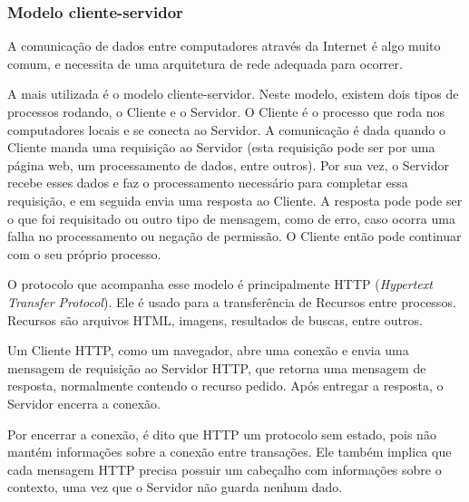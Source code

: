 \documentclass[a4paper,12pt]{article}
\begin{document}
\subsubsection{Modelo cliente-servidor}

A comunicação de dados entre computadores através da Internet é algo muito comum, e necessita de uma arquitetura de rede adequada para ocorrer.

A mais utilizada é o modelo cliente-servidor. Neste modelo, existem dois tipos de processos rodando, o Cliente e o Servidor. O Cliente é o processo que roda nos computadores locais e se conecta ao Servidor. A comunicação é dada quando o Cliente manda uma requisição ao Servidor (esta requisição pode ser por uma página web, um processamento de dados, entre outros). Por sua vez, o Servidor recebe esses dados e faz o processamento necessário para completar essa requisição, e em seguida envia uma resposta ao Cliente. A resposta pode pode ser o que foi requisitado ou outro tipo de mensagem, como de erro, caso ocorra uma falha no processamento ou negação de permissão. O Cliente então pode continuar com o seu próprio processo.



O protocolo que acompanha esse modelo é principalmente HTTP (\emph{Hypertext Transfer Protocol}). Ele é usado para a transferência de Recursos entre processos. Recursos são arquivos HTML, imagens, resultados de buscas, entre outros.

Um Cliente HTTP, como um navegador, abre uma conexão e envia uma mensagem de requisição ao Servidor HTTP, que retorna uma mensagem de resposta, normalmente contendo o recurso pedido. Após entregar a resposta, o Servidor encerra a conexão.

Por encerrar a conexão, é dito que HTTP um protocolo sem estado, pois não mantém informações sobre a conexão entre transações. Ele também implica que cada mensagem HTTP precisa possuir um cabeçalho com informações sobre o contexto, uma vez que o Servidor não guarda nenhum dado.
\end{document}
